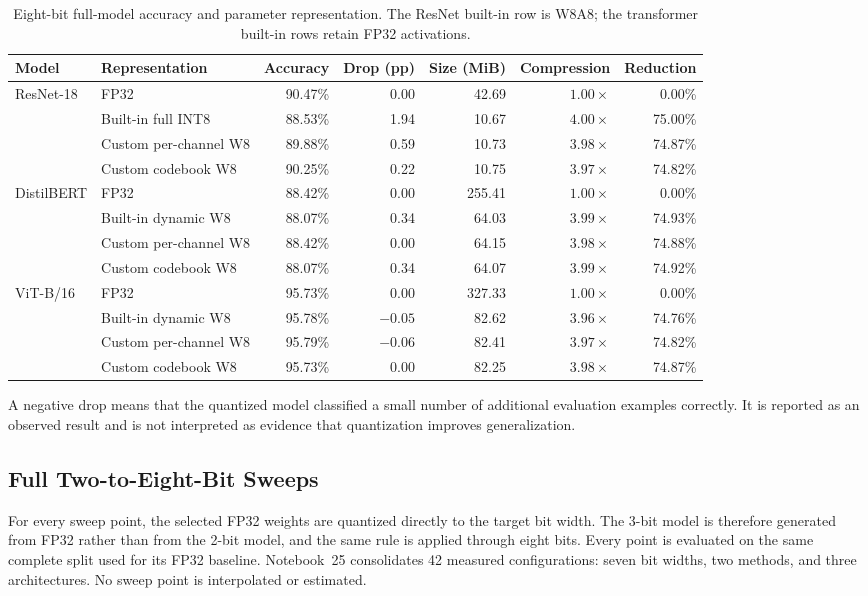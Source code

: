 \documentclass[conference]{IEEEtran}
\begin{document}
\begin{table}[t]
\caption{Eight-bit full-model accuracy and parameter representation. The ResNet built-in row is W8A8; the transformer built-in rows retain FP32 activations.}
\label{tab:w8-results}
\centering
\small
\begin{tabular}{@{}llrrrrr@{}}
\toprule
Model & Representation & Accuracy & Drop (pp) & Size (MiB) & Compression & Reduction \\
\midrule
ResNet-18 & FP32 & 90.47\% & 0.00 & 42.69 & $1.00\times$ & 0.00\% \\
 & Built-in full INT8 & 88.53\% & 1.94 & 10.67 & $4.00\times$ & 75.00\% \\
 & Custom per-channel W8 & 89.88\% & 0.59 & 10.73 & $3.98\times$ & 74.87\% \\
 & Custom codebook W8 & 90.25\% & 0.22 & 10.75 & $3.97\times$ & 74.82\% \\
\midrule
DistilBERT & FP32 & 88.42\% & 0.00 & 255.41 & $1.00\times$ & 0.00\% \\
 & Built-in dynamic W8 & 88.07\% & 0.34 & 64.03 & $3.99\times$ & 74.93\% \\
 & Custom per-channel W8 & 88.42\% & 0.00 & 64.15 & $3.98\times$ & 74.88\% \\
 & Custom codebook W8 & 88.07\% & 0.34 & 64.07 & $3.99\times$ & 74.92\% \\
\midrule
ViT-B/16 & FP32 & 95.73\% & 0.00 & 327.33 & $1.00\times$ & 0.00\% \\
 & Built-in dynamic W8 & 95.78\% & $-0.05$ & 82.62 & $3.96\times$ & 74.76\% \\
 & Custom per-channel W8 & 95.79\% & $-0.06$ & 82.41 & $3.97\times$ & 74.82\% \\
 & Custom codebook W8 & 95.73\% & 0.00 & 82.25 & $3.98\times$ & 74.87\% \\
\bottomrule
\end{tabular}
\end{table}

A negative drop means that the quantized model classified a small number of additional evaluation examples correctly. It is reported as an observed result and is not interpreted as evidence that quantization improves generalization.

\subsection{Full Two-to-Eight-Bit Sweeps}

For every sweep point, the selected FP32 weights are quantized directly to the target bit width. The 3-bit model is therefore generated from FP32 rather than from the 2-bit model, and the same rule is applied through eight bits. Every point is evaluated on the same complete split used for its FP32 baseline. Notebook~25 consolidates 42 measured configurations: seven bit widths, two methods, and three architectures. No sweep point is interpolated or estimated.
\end{document}

